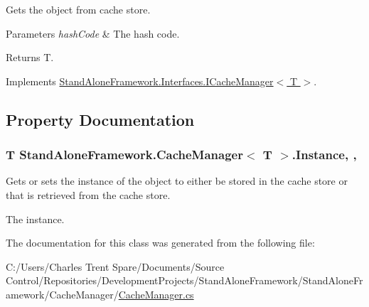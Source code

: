 Gets the object from cache store. 


\begin{DoxyParams}{Parameters}
{\em hash\+Code} & The hash code.\\
\hline
\end{DoxyParams}
\begin{DoxyReturn}{Returns}
T.
\end{DoxyReturn}


Implements \hyperlink{interface_stand_alone_framework_1_1_interfaces_1_1_i_cache_manager_3_01_t_01_4_ab9c4fc7d4950da75c9bddd22634bd1f3}{Stand\+Alone\+Framework.\+Interfaces.\+I\+Cache\+Manager$<$ T $>$}.



\subsection{Property Documentation}
\hypertarget{class_stand_alone_framework_1_1_cache_manager_3_01_t_01_4_a89d30acfacd8f0272d29c60b87f0be25}{
\subsubsection[{Instance}]{\setlength{\rightskip}{0pt plus 5cm}T Stand\+Alone\+Framework.\+Cache\+Manager$<$ T $>$.Instance\hspace{0.3cm}{\ttfamily [get]}, {\ttfamily [set]}, {\ttfamily [protected]}}}\label{class_stand_alone_framework_1_1_cache_manager_3_01_t_01_4_a89d30acfacd8f0272d29c60b87f0be25}


Gets or sets the instance of the object to either be stored in the cache store or that is retrieved from the cache store. 

The instance.

The documentation for this class was generated from the following file\+:\begin{DoxyCompactItemize}
\item 
C\+:/\+Users/\+Charles Trent Spare/\+Documents/\+Source Control/\+Repositories/\+Development\+Projects/\+Stand\+Alone\+Framework/\+Stand\+Alone\+Framework/\+Cache\+Manager/\hyperlink{_cache_manager_8cs}{Cache\+Manager.\+cs}\end{DoxyCompactItemize}

